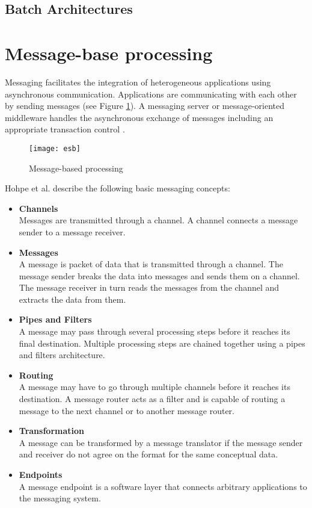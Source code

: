 \subsection{Batch Architectures}

\section{Message-base processing}\label{sec:message_processing}
Messaging facilitates the integration of heterogeneous applications using asynchronous communication. Applications are communicating with each other by sending messages (see Figure \ref{fig:message_based_processing}). A messaging server or message-oriented middleware handles the asynchronous exchange of messages including an appropriate transaction control \cite{conrad2006enterprise}.

\begin{figure}[htbp]
	\centering
	\texttt{[image: esb]}
	\caption{Message-based processing}
	\label{fig:message_based_processing}
\end{figure}

Hohpe et al.\cite{Hohpe:2003fk} describe the following basic messaging concepts:
\begin{itemize}
	\item \textbf{Channels}\\
	Messages are transmitted through a channel. A channel connects a message sender to a message receiver.
	\item \textbf{Messages}\\
	A message is packet of data that is transmitted through a channel. The message sender breaks the data into messages and sends them on a channel. The message receiver in turn reads the messages from the channel and extracts the data from them.
	\item \textbf{Pipes and Filters}\\
	A message may pass through several processing steps before it reaches its final destination. Multiple processing steps are chained together using a pipes and filters architecture.
	\item \textbf{Routing}\\
	A message may have to go through multiple channels before it reaches its destination. A message router acts as a filter and is capable of routing a message to the next channel or to another message router.
	\item \textbf{Transformation}\\
	A message can be transformed by a message translator if the message sender and receiver do not agree on the format for the same conceptual data.
	\item \textbf{Endpoints}\\
	A message endpoint is a software layer that connects arbitrary applications to the messaging system.
\end{itemize}

